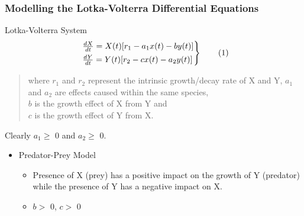 \documentclass[xcolor={svgnames},hyperref={colorlinks,allcolors=Blue}]{beamer}
\begin{document}

\begin{frame}
\frametitle{Modelling the Lotka-Volterra Differential Equations}

\begin{block}{Lotka-Volterra System}
\begin{equation}
	\begin{rcases}
		~\frac{dX}{dt} = X(t)[r_1-a_{1}x(t) - by(t)] \\
		~\frac{dY}{dt} = Y(t)[r_2-cx(t)-a_{2}y(t)] 
	\end{rcases}
	\tag{1}
\end{equation}
\begin{quote}
where $r_1$ and $r_2$ represent the intrinsic growth/decay rate of X and Y, $a_{1}$ and $a_{2}$ are effects caused within the same species, \\ $b$ is the growth effect of X from Y and \\ $c$ is the growth effect of Y from X. 
\end{quote}
\end{block}

\pause
Clearly $a_1 \geqslant$ 0 and $a_2 \geqslant$ 0.
\begin{itemize}
\item Predator-Prey Model
	\begin{itemize}
		\item Presence of X (prey) has a positive impact on the growth of Y (predator) while the presence of Y has a 				negative impact on X.
		\item $b >$ 0, $c >$ 0
	\end{itemize}
\end{itemize}
\end{frame}
\end{document}
